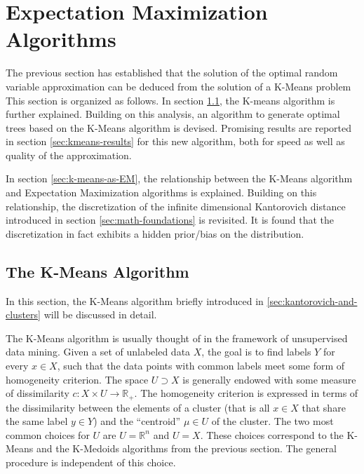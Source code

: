 \section{Expectation Maximization Algorithms}
\label{sec:expect-max-algos}
The previous section has established that the solution of the optimal random variable approximation can be deduced from the solution of a K-Means problem
This section is organized as follows.
In section \ref{sec:k-means-standard}, the K-means algorithm is further explained.
Building on this analysis, an algorithm to generate optimal trees based on the K-Means algorithm is devised.
Promising results are reported in section \ref{sec:kmeans-results} for this new algorithm, both for speed as well as quality of the approximation.

In section \ref{sec:k-means-as-EM}, the relationship between the K-Means algorithm and Expectation Maximization algorithms is explained.
Building on this relationship, the discretization of the infinite dimensional Kantorovich distance introduced in section \ref{sec:math-foundations} is revisited.
It is found that the discretization in fact exhibits a hidden prior/bias on the distribution.
\subsection{The K-Means Algorithm}
\label{sec:k-means-standard}
In this section, the K-Means algorithm briefly introduced in \ref{sec:kantorovich-and-clusters} will be discussed in detail.

The K-Means algorithm is usually thought of in the framework of unsupervised data mining.
Given a set of unlabeled data $X$, the goal is to find labels $Y$ for every $x\in X$, such that the data points with common labels meet some form of homogeneity criterion.
The space $U\supset X$ is generally endowed with some measure of dissimilarity $c: X\times U\rightarrow \mathbb{R}_+$.
The homogeneity criterion is expressed in terms of the dissimilarity between the elements of a cluster (that is all $x\in X$ that share the same label $y\in Y$) and the ``centroid'' $\mu\in U$ of the cluster.
The two most common choices for $U$ are $U=\mathbb{R}^n$ and  $U=X$.
These choices correspond to the K-Means and the K-Medoids algorithms from the previous section.
The general procedure is independent of this choice.

